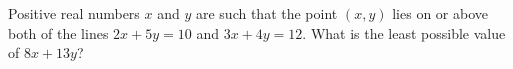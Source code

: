 Positive real numbers $x$ and $y$ are such that the point $(x,y)$ lies on or above both of the lines $2x+5y=10$ and $3x+4y=12$. What is the least possible value of $8x+13y$?
